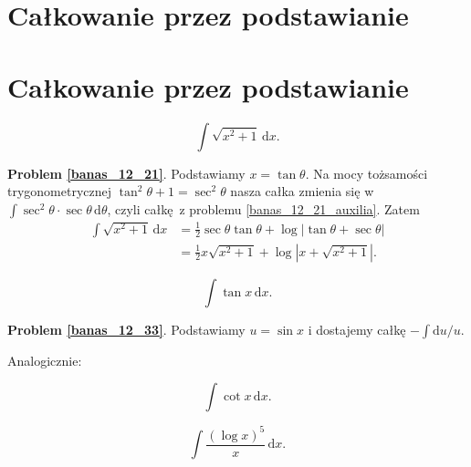 \section{Całkowanie przez podstawianie}
\section{Całkowanie przez podstawianie}



\begin{problem_with_solution}
    \label{banas_12_21}%
    \begin{equation}
        \int \sqrt{x^2 + 1} \, \mathrm{d}x.
    \end{equation}
\end{problem_with_solution}

\textbf{Problem \ref{banas_12_21}}.
Podstawiamy $x = \tan \theta$.
Na mocy tożsamości trygonometrycznej $\tan^2 \theta + 1 = \sec^2 \theta$ nasza całka zmienia się w $\int \sec^2 \theta \cdot \sec \theta \,\mathrm{d}\theta$, czyli całkę z problemu \ref{banas_12_21_auxilia}.
Zatem
\begin{align}
    \int \sqrt{x^2 + 1} \, \mathrm{d}x & = \frac 12 \sec \theta \tan \theta + \log |\tan \theta + \sec \theta| \\
    & = \frac 1 2 x \sqrt{x^2 + 1} + \log \left|x + \sqrt{x^2+1}\right|.
\end{align}

\begin{problem_with_solution}
    \label{banas_12_33}%
    \begin{equation}
        \int \tan x \, \mathrm{d}x.
    \end{equation}
\end{problem_with_solution}

\textbf{Problem \ref{banas_12_33}}.
Podstawiamy $u = \sin x$ i dostajemy całkę $- \int \mathrm{d}u / u$. 

Analogicznie:

\begin{problem}
    \label{banas_12_32}%
    \begin{equation}
        \int \cot x \, \mathrm{d}x.
    \end{equation}
\end{problem}

\begin{problem_with_solution}
    \label{banas_12_36}%
    \begin{equation}
        \int \frac{(\log x)^5}{x} \, \mathrm{d}x.
    \end{equation}
\end{problem_with_solution}

